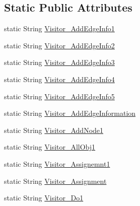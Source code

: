 \subsection*{Static Public Attributes}
\begin{DoxyCompactItemize}
\item 
static String \hyperlink{classit_1_1isislab_1_1masonhelperdocumentation_1_1visitor_1_1_messages_aace4c983dd8157bb044bad4f5645afcd}{Visitor\-\_\-\-Add\-Edge\-Info1}
\item 
static String \hyperlink{classit_1_1isislab_1_1masonhelperdocumentation_1_1visitor_1_1_messages_a98c27f456aa1edc71e637b344968ba22}{Visitor\-\_\-\-Add\-Edge\-Info2}
\item 
static String \hyperlink{classit_1_1isislab_1_1masonhelperdocumentation_1_1visitor_1_1_messages_aad3bae3974d2b7ac08b63484da3deaae}{Visitor\-\_\-\-Add\-Edge\-Info3}
\item 
static String \hyperlink{classit_1_1isislab_1_1masonhelperdocumentation_1_1visitor_1_1_messages_abfb0d61264ca515eafc76c54f0a955f1}{Visitor\-\_\-\-Add\-Edge\-Info4}
\item 
static String \hyperlink{classit_1_1isislab_1_1masonhelperdocumentation_1_1visitor_1_1_messages_a3b5e6189138e1cc4068922ff6e75f599}{Visitor\-\_\-\-Add\-Edge\-Info5}
\item 
static String \hyperlink{classit_1_1isislab_1_1masonhelperdocumentation_1_1visitor_1_1_messages_aa6805b13ea38f7bea7070b7c4ab286e8}{Visitor\-\_\-\-Add\-Edge\-Information}
\item 
static String \hyperlink{classit_1_1isislab_1_1masonhelperdocumentation_1_1visitor_1_1_messages_a742dc29e2bfbc14236b09cb0eb677305}{Visitor\-\_\-\-Add\-Node1}
\item 
static String \hyperlink{classit_1_1isislab_1_1masonhelperdocumentation_1_1visitor_1_1_messages_a732ad7cae8b0d43022cbdd529b2a89fc}{Visitor\-\_\-\-All\-Obj1}
\item 
static String \hyperlink{classit_1_1isislab_1_1masonhelperdocumentation_1_1visitor_1_1_messages_ab57732b9fb9608d022dc162a1a2c2051}{Visitor\-\_\-\-Assignemnt1}
\item 
static String \hyperlink{classit_1_1isislab_1_1masonhelperdocumentation_1_1visitor_1_1_messages_adde53becea948988c000e4312d8b3dd3}{Visitor\-\_\-\-Assignment}
\item 
static String \hyperlink{classit_1_1isislab_1_1masonhelperdocumentation_1_1visitor_1_1_messages_a1319eac75bd5e3bfb49840c37258592d}{Visitor\-\_\-\-Do1}
\item 

\end{DoxyCompactItemize}
